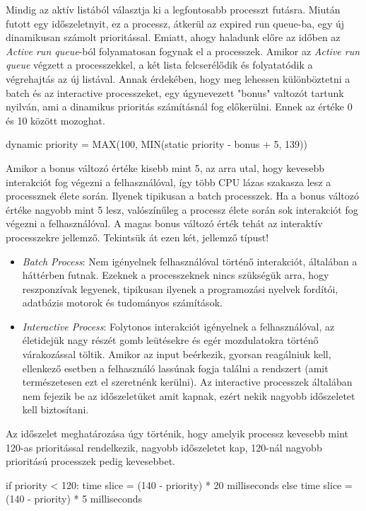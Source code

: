 Mindig az aktív listából választja ki a legfontosabb processzt futásra. Miután futott egy időszeletnyit, ez a processz, átkerül az expired run queue-ba, egy új dinamikusan számolt prioritással.
Emiatt, ahogy haladunk előre az időben az \textit{Active run queue}-ból folyamatosan fogynak el a processzek.  Amikor az \textit{Active run queue} végzett a processzekkel, a két lista felcserélődik és folyatatódik a végrehajtás az új listával.
Annak érdekében, hogy meg lehessen különböztetni a batch és az interactive processzeket, egy úgynevezett "bonus" valtozót tartunk nyilván, ami a dinamikus prioritás számításnál fog előkerülni. Ennek az értéke 0 és 10 között mozoghat.
\begin{cpp}
dynamic priority = MAX(100, MIN(static priority - bonus + 5, 139))
\end{cpp}
Amikor a bonus változó értéke kisebb mint 5, az arra utal, hogy kevesebb interakciót fog végezni a felhasználóval, így több CPU lázas szakasza lesz a processznek élete során. Ilyenek tipikusan a batch processzek.
Ha a bonus változó értéke nagyobb mint 5 lesz, valószínűleg a processz élete során sok interakciót fog végezni a felhasználóval. A magas bonus változó érték tehát az interaktív processzekre jellemző. Tekintsük át ezen két, jellemző típust!
\begin{itemize}
\item \textit{Batch Process}: Nem igényelnek felhasználóval történő interakciót, általában a háttérben futnak. Ezeknek a processzeknek nincs szükségük arra, hogy reszponzívak legyenek, tipikusan ilyenek a programozási nyelvek fordítói, adatbázis motorok és tudományos számítások.
\item \textit{Interactive Process}: Folytonos interakciót igényelnek a felhasználóval, az életidejük nagy részét gomb leütésekre és egér mozdulatokra történő várakozással töltik.
Amikor az input beérkezik, gyorsan reagálniuk kell, ellenkező esetben a felhasználó lassúnak fogja találni a rendszert (amit természetesen ezt el szeretnénk kerülni).
Az interactive processzek általában nem fejezik be az időszeletüket amit kapnak, ezért nekik nagyobb időszeletet kell biztosítani.
\end{itemize}

Az időszelet meghatározása úgy történik, hogy amelyik processz kevesebb mint 120-as prioritással rendelkezik, nagyobb időszeletet kap, 120-nál nagyobb prioritású processzek pedig kevesebbet.
\begin{cpp}
if priority < 120:
    time slice = (140 - priority) * 20 milliseconds 
else
    time slice = (140 - priority) * 5 milliseconds 
\end{cpp}

